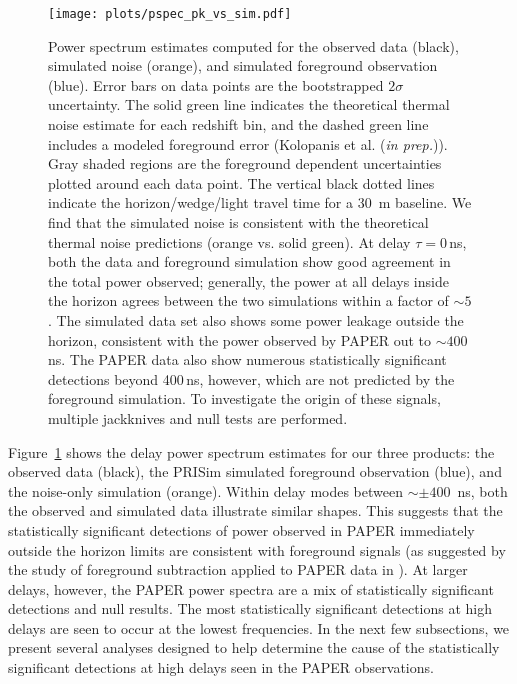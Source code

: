\begin{figure}[tp]
\centering
\texttt{[image: plots/pspec\_pk\_vs\_sim.pdf]}
\caption{Power spectrum estimates computed for
the observed data (black), simulated noise (orange), and simulated foreground observation (blue).
Error bars on data points are the bootstrapped $2\sigma$ uncertainty.
The solid green line indicates the theoretical thermal
noise estimate for each redshift bin, and the dashed
green line includes a modeled foreground error (Kolopanis et al. (\textit{in prep.})).
Gray shaded regions are the foreground dependent uncertainties plotted around each data point.
The vertical black dotted lines indicate the horizon/wedge/light travel time for a 30~m
baseline. We find that the simulated noise is consistent with
the theoretical thermal noise predictions (orange vs. solid green).
At delay $\tau = 0$\,ns, both the data and foreground simulation
show good agreement in the total power observed;
generally, the power at all delays inside the horizon agrees between the two simulations within a factor of $ \sim5 $. The simulated data set also shows some
power leakage outside the horizon,
consistent with the power observed by PAPER out to $ \sim 400$\,ns. The PAPER data also show numerous statistically significant detections beyond 400\,ns, however, which are not predicted by the foreground simulation.
To investigate the origin of these signals, multiple jackknives and null tests are performed.}
\label{fig:pspec_vs_sim}
\end{figure}

Figure~\ref{fig:pspec_vs_sim} shows the delay power spectrum estimates for our three products: the observed data (black),
the PRISim simulated foreground observation (blue), and the noise-only simulation (orange).
Within delay modes between $ \sim\pm 400 $~ns, both the observed and simulated data illustrate
similar shapes. This suggests that the statistically significant detections of power
observed in PAPER immediately outside the horizon limits
are consistent with foreground signals (as suggested by the study of foreground subtraction applied to PAPER data in \citealt{kerrigan_et_al2018}). At larger delays, however, the PAPER power spectra are a mix of statistically significant detections and null results. The most statistically significant detections at high delays are seen to occur at the lowest frequencies. In the next few subsections, we present several analyses designed to help determine the cause of the statistically significant detections at high delays seen in the PAPER observations.

